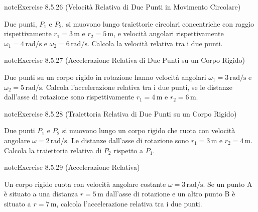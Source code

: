 \documentclass[letterpaper,10pt,italian]{jupyterBook}
\begin{document}
\begin{sphinxadmonition}{note}{Exercise 8.5.26 (Velocità Relativa di Due Punti in Movimento Circolare)}



\sphinxAtStartPar
Due punti, \(P_1\) e \(P_2\), si muovono lungo traiettorie circolari concentriche con raggio rispettivamente \(r_1 = 3 \, \text{m}\) e \(r_2 = 5 \, \text{m}\), e velocità angolari rispettivamente \(\omega_1 = 4 \, \text{rad/s}\) e \(\omega_2 = 6 \, \text{rad/s}\). Calcola la velocità relativa tra i due punti.
\end{sphinxadmonition}
 \label{exercise:ch/mechanics/kinematics-problems-exercise-26}

\begin{sphinxadmonition}{note}{Exercise 8.5.27 (Accelerazione Relativa di Due Punti su un Corpo Rigido)}



\sphinxAtStartPar
Due punti su un corpo rigido in rotazione hanno velocità angolari \(\omega_1 = 3 \, \text{rad/s}\) e \(\omega_2 = 5 \, \text{rad/s}\). Calcola l’accelerazione relativa tra i due punti, se le distanze dall’asse di rotazione sono rispettivamente \(r_1 = 4 \, \text{m}\) e \(r_2 = 6 \, \text{m}\).
\end{sphinxadmonition}
 \label{exercise:ch/mechanics/kinematics-problems-exercise-27}

\begin{sphinxadmonition}{note}{Exercise 8.5.28 (Traiettoria Relativa di Due Punti su un Corpo Rigido)}



\sphinxAtStartPar
Due punti \(P_1\) e \(P_2\) si muovono lungo un corpo rigido che ruota con velocità angolare \(\omega = 2 \, \text{rad/s}\). Le distanze dall’asse di rotazione sono \(r_1 = 3 \, \text{m}\) e \(r_2 = 4 \, \text{m}\). Calcola la traiettoria relativa di \(P_2\) rispetto a \(P_1\).
\end{sphinxadmonition}
 \label{exercise:ch/mechanics/kinematics-problems-exercise-28}

\begin{sphinxadmonition}{note}{Exercise 8.5.29 (Accelerazione Relativa)}



\sphinxAtStartPar
Un corpo rigido ruota con velocità angolare costante \(\omega = 3 \, \text{rad/s}\). Se un punto A è situato a una distanza \(r = 5 \, \text{m}\) dall’asse di rotazione e un altro punto B è situato a \(r = 7 \, \text{m}\), calcola l’accelerazione relativa tra i due punti.
\end{sphinxadmonition}
\end{document}
